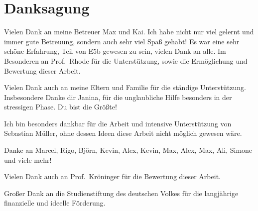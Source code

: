 \thispagestyle{empty}
\section*{\color{tugreen}Danksagung}
%
Vielen Dank an meine Betreuer Max und Kai. Ich habe nicht nur viel gelernt und immer gute Betreuung,
sondern auch sehr viel Spaß gehabt! Es war eine sehr schöne Erfahrung, Teil von E5b gewesen zu sein,
vielen Dank an alle. Im Besonderen an Prof.~Rhode für die Unterstützung, sowie die Ermöglichung und
Bewertung dieser Arbeit.

Vielen Dank auch an meine Eltern und Familie für die ständige Unterstützung. Insbesondere Danke dir
Janina, für die unglaubliche Hilfe besonders in der stressigen Phase. Du bist die Größte!

Ich bin besonders dankbar für die Arbeit und intensive Unterstützung von Sebastian Müller, ohne
dessen Ideen diese Arbeit nicht möglich gewesen wäre.

Danke an Marcel, Rigo, Björn, Kevin, Alex, Kevin, Max, Alex, Max, Ali, Simone und viele mehr!

Vielen Dank auch an Prof.~Kröninger für die Bewertung dieser Arbeit.

Großer Dank an die Studienstiftung des deutschen Volkes für die langjährige finanzielle und ideelle Förderung.
